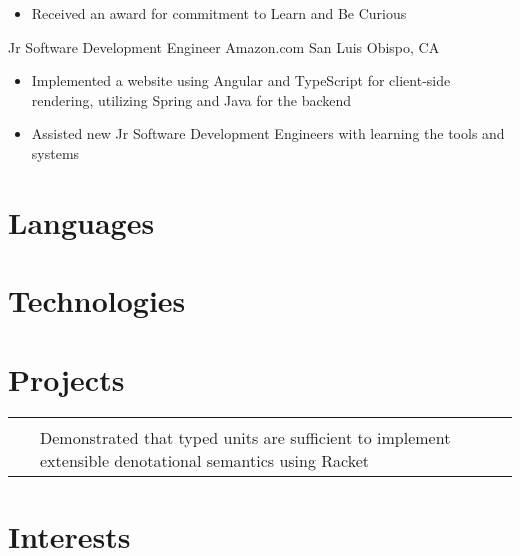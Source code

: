 \documentclass[11pt,a4paper,sans,final]{moderncv}
\makeatletter
\newcommand{\project}[3]{
    \begin{tabular}{p{\hintscolumnwidth}@{\hspace{\separatorcolumnwidth}}p{\maincolumnwidth}@{}}
        \raggedleft\hintstyle{#1} & #2\\
                            ~     & #3
    \end{tabular}
}
\makeatother
\begin{document}
\begin{FlushLeft}
{\begin{itemize}
                \item Received an award for commitment to Learn and Be Curious
            \end{itemize}
        }
        {Jr Software Development Engineer}
        {Amazon.com}
        {San Luis Obispo, CA}
        {}
        {
            \begin{itemize}
                \item Implemented a website using Angular and TypeScript for client-side rendering, utilizing Spring and Java for the backend
                \item Assisted new Jr Software Development Engineers with learning the tools and systems
            \end{itemize}
        }

    \section{Languages}

    \section{Technologies}

    \section{Projects}
    \project{Senior Project}
        {\httplink{https://github.com/thewells1024/SeniorProject}}
        {
            \raggedright{Demonstrated that typed units are sufficient to implement extensible denotational semantics using Racket}
        }

    \section{Interests}
\end{FlushLeft}
\end{document}
